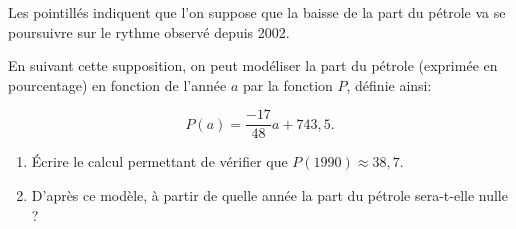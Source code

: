 \begin{enumerate}
Les pointillés indiquent que l'on suppose que la baisse de la part du pétrole va se poursuivre sur le rythme observé depuis 2002. 

En suivant cette supposition, on peut modéliser la part du pétrole (exprimée en pourcentage) en fonction de l'année $a$ par la fonction $P$, définie ainsi: 

\[P(a) = \dfrac{- 17}{48}a + 743,5.\] 

	\begin{enumerate}
		\item Écrire le calcul permettant de vérifier que $P(1990) \approx 38,7$. 
		\item D'après ce modèle, à partir de quelle année la part du pétrole sera-t-elle nulle ? 
	\end{enumerate}
\end{enumerate}


